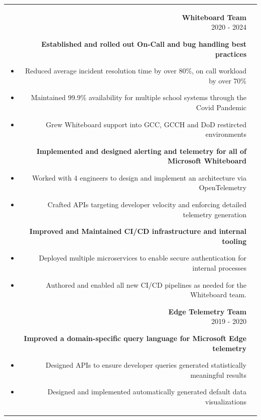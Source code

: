 \documentclass[letterpaper,10pt]{article} %
\begin{document}
\begin{tabular}{r|p{14.5cm}}
{%
}
{\textbf{ Whiteboard Team}
\\
 \textsc{2020 - 2024}}{
\textbf{Established and rolled out On-Call and bug handling best practices}
\begin{itemize}
	\item{Reduced average incident resolution time by over 80\%, on call workload by over 70\%}
	\item{Maintained 99.9\% availability for multiple school systems through the Covid Pandemic}
	\item{Grew Whiteboard support into GCC, GCCH and DoD restircted environments}
\end{itemize}

\textbf{Implemented and designed alerting and telemetry for all of Microsoft Whiteboard}
\begin{itemize}
	\item{Worked with 4 engineers to design and implement an architecture via OpenTelemetry}
	\item{Crafted APIs targeting developer velocity and enforcing detailed telemetry generation}
\end{itemize}

\textbf{Improved and Maintained CI/CD infrastructure and internal tooling}
\begin{itemize}
	\item{Deployed multiple microservices to enable secure authentication for internal processes}
	\item{Authored and enabled all new CI/CD pipelines as needed for the Whiteboard team.}
\end{itemize}

}
{\textbf{ Edge Telemetry Team } 
\\
 \textsc{2019 - 2020}}{
\textbf{Improved a domain-specific query language for Microsoft Edge telemetry}
\begin{itemize}
	\item{Designed APIs to ensure developer queries generated statistically meaningful results}
	\item{Designed and implemented automatically generated default data visualizations}
\end{itemize}

}
\end{tabular}
\end{document}
